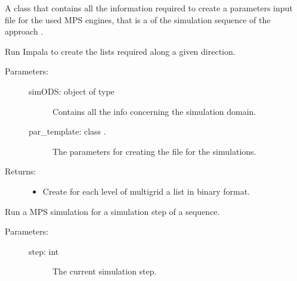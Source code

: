 \documentclass[letterpaper,10pt,english]{sphinxmanual}
\begin{document}
\begin{fulllineitems}
\label{\detokenize{appendices:s2Dcd.s2Dcd.SeqStep}}
A class that contains all the information required to create a
parameters input file for the used MPS engines, that is a  of
the simulation sequence of the approach .

\begin{fulllineitems}
\label{\detokenize{appendices:s2Dcd.s2Dcd.SeqStep.create_list}}
Run Impala to create the lists required along a given
direction.
\begin{description}
\item[{Parameters:}] \leavevmode\begin{description}
\item[{simODS: object of type }] \leavevmode
Contains all the info concerning the simulation
domain.

\item[{par\_template: class .}] \leavevmode
The parameters for creating the  file for the
simulations.

\end{description}

\item[{Returns:}] \leavevmode\begin{itemize}
\item {} 
Create for each level of multigrid a list in binary format.

\end{itemize}

\end{description}

\end{fulllineitems}


\begin{fulllineitems}
\label{\detokenize{appendices:s2Dcd.s2Dcd.SeqStep.simul}}
Run a MPS simulation for a simulation step of a sequence.
\begin{description}
\item[{Parameters:}] \leavevmode\begin{description}
\item[{step: int}] \leavevmode
The current simulation step.


\end{description}
\end{description}
\end{fulllineitems}
\end{fulllineitems}
\end{document}
